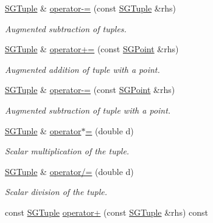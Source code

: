 \begin{DoxyCompactItemize}
\hyperlink{classSGTuple}{S\+G\+Tuple} \& \hyperlink{classSGTuple_ae3c5e1bb4faf5fb652cdb8440133d2de}{operator-\/=} (const \hyperlink{classSGTuple}{S\+G\+Tuple} \&rhs)
\begin{DoxyCompactList}\small\item\em Augmented subtraction of tuples. \end{DoxyCompactList}\item 
\hyperlink{classSGTuple}{S\+G\+Tuple} \& \hyperlink{classSGTuple_af3e77720996ec599cdffea08f92355ae}{operator+=} (const \hyperlink{classSGPoint}{S\+G\+Point} \&rhs)
\begin{DoxyCompactList}\small\item\em Augmented addition of tuple with a point. \end{DoxyCompactList}\item 
\hyperlink{classSGTuple}{S\+G\+Tuple} \& \hyperlink{classSGTuple_a2e6d730692fe4e702e021044dd9889a8}{operator-\/=} (const \hyperlink{classSGPoint}{S\+G\+Point} \&rhs)
\begin{DoxyCompactList}\small\item\em Augmented subtraction of tuple with a point. \end{DoxyCompactList}\item 
\mbox{\label{classSGTuple_a26a157fe2e19fef59e17e58d1c0e99c1}} 
\hyperlink{classSGTuple}{S\+G\+Tuple} \& \hyperlink{classSGTuple_a26a157fe2e19fef59e17e58d1c0e99c1}{operator$\ast$=} (double d)
\begin{DoxyCompactList}\small\item\em Scalar multiplication of the tuple. \end{DoxyCompactList}\item 
\mbox{\label{classSGTuple_a63277a0693207afb1ddbc048df29534a}} 
\hyperlink{classSGTuple}{S\+G\+Tuple} \& \hyperlink{classSGTuple_a63277a0693207afb1ddbc048df29534a}{operator/=} (double d)
\begin{DoxyCompactList}\small\item\em Scalar division of the tuple. \end{DoxyCompactList}\item 
\mbox{\label{classSGTuple_a13451a8948eaa36865993517231c3bb3}} 
const \hyperlink{classSGTuple}{S\+G\+Tuple} \hyperlink{classSGTuple_a13451a8948eaa36865993517231c3bb3}{operator+} (const \hyperlink{classSGTuple}{S\+G\+Tuple} \&rhs) const

\end{DoxyCompactItemize}
